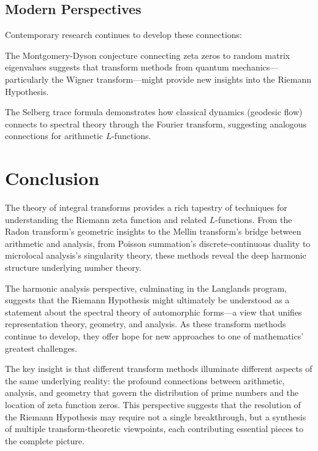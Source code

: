 \subsection{Modern Perspectives}

Contemporary research continues to develop these connections:

\begin{example}
The Montgomery-Dyson conjecture \cite{montgomery1973} connecting zeta zeros to random matrix eigenvalues suggests that transform methods from quantum mechanics—particularly the Wigner transform—might provide new insights into the Riemann Hypothesis.
\end{example}

\begin{example}
The Selberg trace formula demonstrates how classical dynamics (geodesic flow) connects to spectral theory through the Fourier transform, suggesting analogous connections for arithmetic $L$-functions.
\end{example}

\section{Conclusion}

The theory of integral transforms provides a rich tapestry of techniques for understanding the Riemann zeta function and related $L$-functions. From the Radon transform's geometric insights to the Mellin transform's bridge between arithmetic and analysis, from Poisson summation's discrete-continuous duality to microlocal analysis's singularity theory, these methods reveal the deep harmonic structure underlying number theory.

The harmonic analysis perspective, culminating in the Langlands program, suggests that the Riemann Hypothesis might ultimately be understood as a statement about the spectral theory of automorphic forms—a view that unifies representation theory, geometry, and analysis. As these transform methods continue to develop, they offer hope for new approaches to one of mathematics' greatest challenges.

The key insight is that different transform methods illuminate different aspects of the same underlying reality: the profound connections between arithmetic, analysis, and geometry that govern the distribution of prime numbers and the location of zeta function zeros. This perspective suggests that the resolution of the Riemann Hypothesis may require not a single breakthrough, but a synthesis of multiple transform-theoretic viewpoints, each contributing essential pieces to the complete picture.